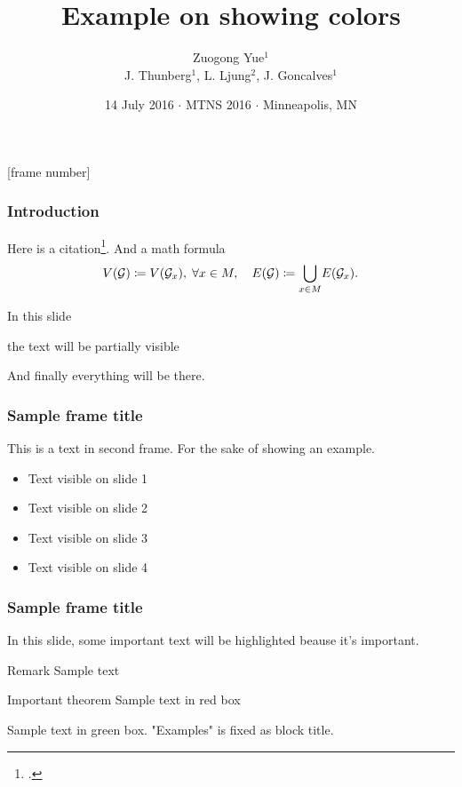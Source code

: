 \documentclass[aspectratio=169]{beamer}
\title[]{Example on showing colors}
\subtitle{}
\author{\small Zuogong Yue$^1$\\[1ex] J. Thunberg$^1$, L. Ljung$^2$, J. Goncalves$^1$}
\institute[]{
    \begin{tabular}{ll}
       $^1$ University of Luxembourg, Luxembourg\\
       $^2$ Link\"{o}ping University, Sweden
    \end{tabular}}
\date{\footnotesize 14 July 2016 $\cdot$ MTNS 2016 $\cdot$ Minneapolis, MN}
\begin{document}
\begin{frame}
  \titlepage
\end{frame}
[frame number]  %
\setcounter{framenumber}{0}



\begin{frame}
  \frametitle{Introduction}

  Here is a citation\footcite{Goncalves2009}. And a math formula
  \begin{equation*}
    V(\mathcal{G}) \coloneqq V(\mathcal{G}_x), \;\forall x \in M,
    \quad
    E(\mathcal{G}) \coloneqq \underset{
      \begin{subarray}{c}
        x \in M
      \end{subarray}
    }{\bigcup}E(\mathcal{G}_x).
  \end{equation*}
\end{frame}



\begin{frame}
  In this slide \pause

  the text will be partially visible \pause

  And finally everything will be there.
\end{frame}



\begin{frame}
  \frametitle{Sample frame title}
  This is a text in second frame.
  For the sake of showing an example.

  \begin{itemize}
  \item<1-> Text visible on slide 1
  \item<2-> Text visible on slide 2
  \item<3> Text visible on slide 3
  \item<4-> Text visible on slide 4
  \end{itemize}
\end{frame}



\begin{frame}
  \frametitle{Sample frame title}

  In this slide, some important text will be
  \alert{highlighted} beause it's important.

  \begin{block}{Remark}
    Sample text
  \end{block}

  \begin{alertblock}{Important theorem}
    Sample text in red box
  \end{alertblock}

  \begin{examples}
    Sample text in green box. "Examples" is fixed as block title.
  \end{examples}
\end{frame}
\end{document}
